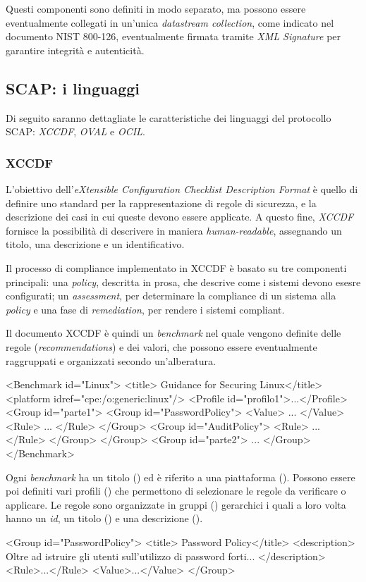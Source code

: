 \documentclass[../main.tex]{subfiles}
\begin{document}
Questi componenti sono definiti in modo separato, ma possono essere eventualmente collegati in un'unica \textit{datastream collection}, come indicato nel documento NIST 800-126, eventualmente firmata tramite \textit{XML Signature} per garantire integrità e autenticità.

\subsection{SCAP: i linguaggi}
Di seguito saranno dettagliate le caratteristiche dei linguaggi del protocollo SCAP: \textit{XCCDF}, \textit{OVAL} e \textit{OCIL}.
\subsubsection{XCCDF}
L'obiettivo dell'\textit{eXtensible Configuration Checklist Description Format} è quello di definire uno standard per la rappresentazione di regole di sicurezza, e la descrizione dei casi in cui queste devono essere applicate.
A questo fine, \textit{XCCDF} fornisce la possibilità di descrivere in maniera \textit{human-readable}, assegnando un titolo, una descrizione e un identificativo.

Il processo di compliance implementato in XCCDF è basato su tre componenti principali: una \textit{policy}, descritta in prosa, che descrive come i sistemi devono esesre configurati; un \textit{assessment}, per determinare la compliance di un sistema alla \textit{policy} e una fase di \textit{remediation}, per rendere i sistemi compliant.

Il documento XCCDF è quindi un \textit{benchmark} nel quale vengono definite delle regole (\textit{recommendations}) e dei valori, che possono essere eventualmente raggruppati e organizzati secondo un'alberatura.
\begin{xml}
<Benchmark id="Linux">
    <title> Guidance for Securing Linux</title>
    <platform idref="cpe:/o:generic:linux"/>
    <Profile id="profilo1">...</Profile>
    <Group id="parte1">
        <Group id="PasswordPolicy">
                <Value> ... </Value>
                <Rule> ... </Rule>
        </Group>
        <Group id="AuditPolicy">
            <Rule> ... </Rule>
        </Group>
    </Group>
    <Group id="parte2">
        ...
    </Group>
</Benchmark>
\end{xml}
Ogni \textit{benchmark} ha un titolo () ed è riferito a una piattaforma (). Possono essere poi definiti vari profili () che permettono di selezionare le regole da verificare o applicare.
Le regole sono organizzate in gruppi () gerarchici i quali a loro volta hanno un \textit{id}, un titolo () e una descrizione ().
\begin{xml}
<Group id="PasswordPolicy">
    <title> Password Policy</title>
    <description>
        Oltre ad istruire gli utenti sull'utilizzo di password forti...
    </description>
    <Rule>...</Rule>
    <Value>...</Value>
</Group>
\end{xml}
\end{document}
